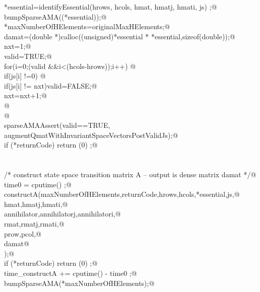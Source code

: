 \documentclass[12pt]{article}
\begin{document}
\begin{flushleft}
\begin{minipage}{\linewidth}
\begin{list}{}{}
\mbox{}\verb@        *essential=identifyEssential(hrows, hcols, hmat, hmatj, hmati, js) ;@\\
\mbox{}\verb@        bumpSparseAMA((*essential));@\\
\mbox{}\verb@        *maxNumberOfHElements=originalMaxHElements;@\\
\mbox{}\verb@        damat=(double *)calloc((unsigned)*essential * *essential,sizeof(double));@\\
\mbox{}\verb@        nxt=1;@\\
\mbox{}\verb@        valid=TRUE;@\\
\mbox{}\verb@        for(i=0;(valid &&i<(hcols-hrows));i++) {@\\
\mbox{}\verb@                if(js[i] !=0) {@\\
\mbox{}\verb@                  if(js[i] != nxt){valid=FALSE;}@\\
\mbox{}\verb@                nxt=nxt+1;@\\
\mbox{}\verb@                }@\\
\mbox{}\verb@        }@\\
\mbox{}\verb@        sparseAMAAssert(valid==TRUE, augmentQmatWithInvariantSpaceVectorsPostValidJs);@\\
\mbox{}\verb@        if (*returnCode) return (0) ;@\\
\mbox{}\verb@@\\
\mbox{}\verb@@\\
\mbox{}\verb@        /* construct state space transition matrix A -- output is dense matrix damat */@\\
\mbox{}\verb@        time0 = cputime() ;@\\
\mbox{}\verb@        constructA(maxNumberOfHElements,returnCode,hrows,hcols,*essential,js,@\\
\mbox{}\verb@                hmat,hmatj,hmati,@\\
\mbox{}\verb@                annihilator,annihilatorj,annihilatori,@\\
\mbox{}\verb@                rmat,rmatj,rmati,@\\
\mbox{}\verb@                prow,pcol,@\\
\mbox{}\verb@                damat@\\
\mbox{}\verb@        );@\\
\mbox{}\verb@        if (*returnCode) return (0) ;@\\
\mbox{}\verb@        time_constructA += cputime() - time0 ;@\\
\mbox{}\verb@        bumpSparseAMA(*maxNumberOfHElements);@\\

\end{list}
\end{minipage}
\end{flushleft}
\end{document}
